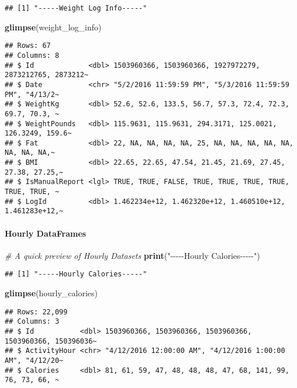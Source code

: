 \documentclass[
]{article}
\newenvironment{Shaded}{\begin{snugshade}}{\end{snugshade}}
\newcommand{\CommentTok}[1]{\textcolor[rgb]{0.56,0.35,0.01}{\textit{#1}}}
\newcommand{\FunctionTok}[1]{\textcolor[rgb]{0.13,0.29,0.53}{\textbf{#1}}}
\newcommand{\NormalTok}[1]{#1}
\newcommand{\StringTok}[1]{\textcolor[rgb]{0.31,0.60,0.02}{#1}}
\begin{document}
\begin{verbatim}
## [1] "-----Weight Log Info-----"
\end{verbatim}

\begin{Shaded}
\begin{Highlighting}[]
\FunctionTok{glimpse}\NormalTok{(weight\_log\_info)}
\end{Highlighting}
\end{Shaded}

\begin{verbatim}
## Rows: 67
## Columns: 8
## $ Id             <dbl> 1503960366, 1503960366, 1927972279, 2873212765, 2873212~
## $ Date           <chr> "5/2/2016 11:59:59 PM", "5/3/2016 11:59:59 PM", "4/13/2~
## $ WeightKg       <dbl> 52.6, 52.6, 133.5, 56.7, 57.3, 72.4, 72.3, 69.7, 70.3, ~
## $ WeightPounds   <dbl> 115.9631, 115.9631, 294.3171, 125.0021, 126.3249, 159.6~
## $ Fat            <dbl> 22, NA, NA, NA, NA, 25, NA, NA, NA, NA, NA, NA, NA, NA,~
## $ BMI            <dbl> 22.65, 22.65, 47.54, 21.45, 21.69, 27.45, 27.38, 27.25,~
## $ IsManualReport <lgl> TRUE, TRUE, FALSE, TRUE, TRUE, TRUE, TRUE, TRUE, TRUE, ~
## $ LogId          <dbl> 1.462234e+12, 1.462320e+12, 1.460510e+12, 1.461283e+12,~
\end{verbatim}

\hypertarget{hourly-dataframes}{%
\paragraph{Hourly DataFrames}\label{hourly-dataframes}}

\begin{Shaded}
\begin{Highlighting}[]
\CommentTok{\# A quick preview of Hourly Datasets}
\FunctionTok{print}\NormalTok{(}\StringTok{"{-}{-}{-}{-}{-}Hourly Calories{-}{-}{-}{-}{-}"}\NormalTok{)}
\end{Highlighting}
\end{Shaded}

\begin{verbatim}
## [1] "-----Hourly Calories-----"
\end{verbatim}

\begin{Shaded}
\begin{Highlighting}[]
\FunctionTok{glimpse}\NormalTok{(hourly\_calories)}
\end{Highlighting}
\end{Shaded}

\begin{verbatim}
## Rows: 22,099
## Columns: 3
## $ Id           <dbl> 1503960366, 1503960366, 1503960366, 1503960366, 150396036~
## $ ActivityHour <chr> "4/12/2016 12:00:00 AM", "4/12/2016 1:00:00 AM", "4/12/20~
## $ Calories     <dbl> 81, 61, 59, 47, 48, 48, 48, 47, 68, 141, 99, 76, 73, 66, ~
\end{verbatim}
\end{document}
